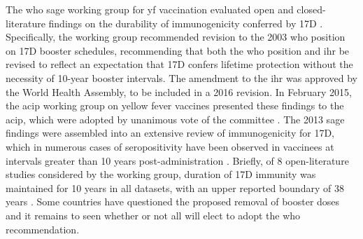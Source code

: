 The \gls{who} \gls{sage} working group for \gls{yf} vaccination evaluated open and closed-literature findings on the durability of immunogenicity conferred by 17D \parencite{Anonymous:6Th9TjOR}. Specifically, the working group recommended revision to the 2003 \gls{who} position on 17D booster schedules, recommending that both the \gls{who} position and \gls{ihr} be revised to reflect an expectation that 17D confers lifetime protection without the necessity of 10-year booster intervals. The amendment to the \gls{ihr} was approved by the World Health Assembly, to be included in a 2016 revision. In February 2015, the \gls{acip} working group on yellow fever vaccines presented these findings to the \gls{acip}, which were adopted by unanimous vote of the committee \parencite{NCIRD:2015wm}. The 2013 \gls{sage} findings were assembled into an extensive review of immunogenicity for 17D, which in numerous cases of seropositivity have been observed in vaccinees at intervals greater than 10 years post-administration \parencite{Gotuzzo:2013cg}. Briefly, of 8 open-literature studies considered by the working group, duration of 17D immunity was maintained for 10 years in all datasets, with an upper reported boundary of 38 years \parencite{Niedrig:1999wo}. Some countries have questioned the proposed removal of booster doses and it remains to seen whether or not all will elect to adopt the \gls{who} recommendation.


